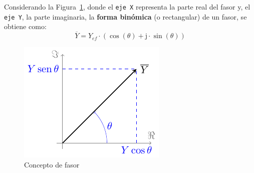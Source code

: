 

	
Considerando la Figura~\ref{fig.fasor}, donde el \texttt{eje X}
representa la parte real del fasor y, el \texttt{eje Y}, la parte
imaginaria, la \textbf{forma binómica} (o rectangular) de un fasor, se
obtiene como:
\begin{equation}
  \boxed{\overline{Y} = Y_{ef}\cdot(\cos(\theta)+\mathrm{j}\cdot\sin(\theta))}
\end{equation}
\begin{figure}[H]
  \centering \includegraphics{../figs/fasor.pdf}
  \caption{Concepto de fasor}
  \label{fig.fasor}
\end{figure}
	
